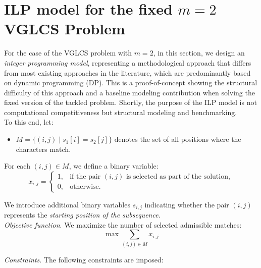 \documentclass[runningheads]{llncs}
\begin{document}
	
	
 \newpage
 \appendix
 \section{ILP model for the fixed $m=2$ VGLCS Problem}\label{app:ilp}
 
 For the case of the VGLCS problem with $m=2$, in this section, we design an
 \emph{integer programming model}, representing a methodological approach that differs from
 most existing approaches in the literature, which are predominantly based on dynamic
 programming (DP). This is a proof-of-concept showing the structural difficulty of this approach and a baseline modeling contribution when solving the fixed version of the tackled problem. Shortly, the purpose of the ILP model is not computational competitiveness but structural modeling and benchmarking. \\
 
 To this end, let:
 \begin{itemize}
 	\item $M = \{ (i,j) \mid s_1[i] = s_2[j] \}$ denotes the set of all positions where the characters match.
 \end{itemize}
 
 For each $(i,j) \in M$, we define a binary variable:
 \[
 x_{i,j} =
 \begin{cases}
 	1, & \textrm{if the pair } (i,j) \textrm{ is selected as part of the solution}, \\
 	0, & \textrm{otherwise}.
 \end{cases}
 \]
 
 We introduce additional binary variables $s_{i,j}$ indicating whether the pair $(i,j)$ represents
 the \emph{starting position of the subsequence}. \\
 
 \textit{Objective function}. We maximize the number of selected admissible matches:
 \[
 \max \sum_{(i,j) \in M} x_{i,j}
 \]
 
 \textit{Constraints}. The following constraints are imposed:
 
\end{document}
